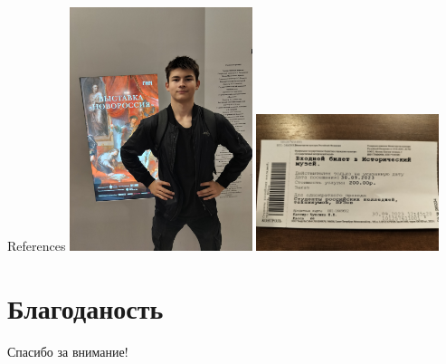 \begin{frame}[t]{References}
	\printbibliography
	\includegraphics[width=0.4\textwidth]{images/self.jpg}
	\includegraphics[width=0.4\textwidth]{images/ticket.jpg}
	\url{}
	\url{}
\end{frame}

\section{Благоданость}
\begin{frame}
	\centering
	\huge
	Спасибо за внимание!
\end{frame}



